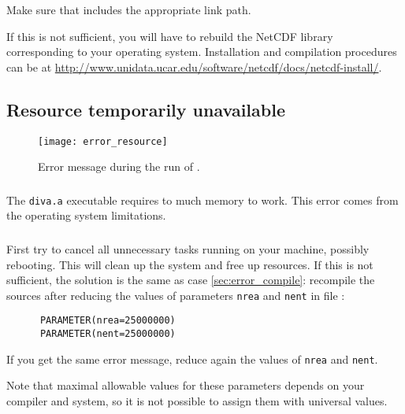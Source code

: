 Make sure that  includes the appropriate link path.

If this is not sufficient, you will have to rebuild the NetCDF library corresponding to your operating system. Installation and compilation procedures can be at \url{http://www.unidata.ucar.edu/software/netcdf/docs/netcdf-install/}.



\subsection[Resource temporarily unavailable]{Resource temporarily unavailable\label{sec:error_resource}}


\begin{figure}[htpb]
\centering
\texttt{[image: error\_resource]}
\caption{Error message during the run of \label{fig:error_resource}.}
\end{figure}

\subsubsection{\question}

The \texttt{diva.a} executable requires to much memory to work. This error comes from the operating system limitations.

\subsubsection{\answer}
First try to cancel all unnecessary tasks running on your machine, possibly rebooting. This will clean up the system and free up resources. If this is not sufficient, the solution is the same as case \ref{sec:error_compile}: recompile the sources after reducing the values of parameters \texttt{nrea} and \texttt{nent} in file :
\begin{verbatim}
      PARAMETER(nrea=25000000)
      PARAMETER(nent=25000000)
\end{verbatim}
If you get the same error message, reduce again the values of \texttt{nrea} and \texttt{nent}.

Note that maximal allowable values for these parameters depends on your compiler and system, so it is not possible to assign them with universal values.

